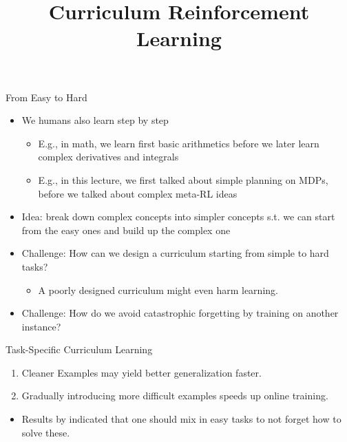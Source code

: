 \documentclass[aspectratio=169]{../latex_main/tntbeamer}  %
\title[Curriculum RL]{Curriculum Reinforcement Learning}
\begin{document}
	
	\maketitle

\begin{frame}[c]{From Easy to Hard}


\begin{itemize}
	\item We humans also learn step by step
	\begin{itemize}
		\item E.g., in math, we learn first basic arithmetics before we later learn complex derivatives and integrals
		\item E.g., in this lecture, we first talked about simple planning on MDPs, before we talked about complex meta-RL ideas
	\end{itemize}
	\smallskip
	\item \alert{Idea:} break down complex concepts into simpler concepts s.t. we can start from the easy ones and build up the complex one
	\item \alert{Challenge}: How can we design a curriculum starting from simple to hard tasks?
	\begin{itemize}
		\item A poorly designed curriculum might even harm learning.
	\end{itemize}
	\item \alert{Challenge}: How do we avoid catastrophic forgetting by training on another instance?
\end{itemize}


\end{frame}
\begin{frame}[c]{Task-Specific Curriculum Learning~}

	\begin{enumerate}
		\item Cleaner Examples may yield better generalization faster.
		\item Gradually introducing more difficult examples speeds up online training.
	\end{enumerate}

	\begin{itemize}
		\item Results by  indicated that one should mix in easy tasks to not forget how to solve these.
	\end{itemize}

	
\end{frame}
\end{document}

